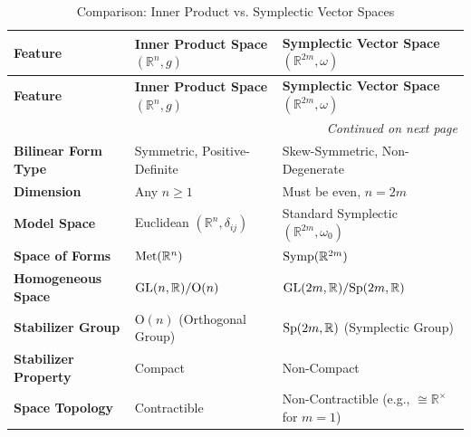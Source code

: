 \renewcommand{\arraystretch}{1.2} %
\begin{longtable}{l|>{\raggedright\arraybackslash}p{5cm}|>{\raggedright\arraybackslash}p{5cm}}
\caption{Comparison: Inner Product vs. Symplectic Vector Spaces}
\label{tab:inner_symplectic_comparison} \\
\hline
\textbf{Feature} & \textbf{Inner Product Space $(\mathbb{R}^n, g)$} & \textbf{Symplectic Vector Space $(\mathbb{R}^{2m}, \omega)$} \\
\hline \hline
\endfirsthead

\hline
\textbf{Feature} & \textbf{Inner Product Space $(\mathbb{R}^n, g)$} & \textbf{Symplectic Vector Space $(\mathbb{R}^{2m}, \omega)$} \\
\hline \hline
\endhead

\hline
\multicolumn{3}{r}{\textit{Continued on next page}} \\
\endfoot

\hline
\endlastfoot

\textbf{Bilinear Form Type} & Symmetric, Positive-Definite & Skew-Symmetric, Non-Degenerate \\
\hline
\textbf{Dimension} & Any $n \ge 1$ & Must be even, $n = 2m$ \\
\hline
\textbf{Model Space} & Euclidean $(\mathbb{R}^n, \delta_{ij})$ & Standard Symplectic $(\mathbb{R}^{2m}, \omega_0)$ \\
\hline
\textbf{Space of Forms} & $\operatorname{Met}(\mathbb{R}^n)$ & $\operatorname{Symp}(\mathbb{R}^{2m})$ \\
\hline
\textbf{Homogeneous Space} & $\mathrm{GL}(n, \mathbb{R}) / \text{O}(n)$ & $\mathrm{GL}(2m, \mathbb{R}) / \mathrm{Sp}(2m, \mathbb{R})$ \\
\hline
\textbf{Stabilizer Group} & $\text{O}(n)$ (Orthogonal Group) & $\mathrm{Sp}(2m, \mathbb{R})$ (Symplectic Group) \\
\hline
\textbf{Stabilizer Property} & Compact & Non-Compact \\
\hline
\textbf{Space Topology} & Contractible & Non-Contractible (e.g., $\cong \mathbb{R}^\times$ for $m=1$) \\
\end{longtable}
\renewcommand{\arraystretch}{1.0}



